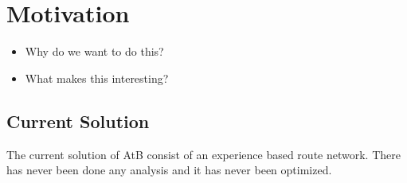 \section{Motivation}
\begin{itemize}
\item Why do we want to do this?
\item What makes this interesting?
\end{itemize}

\subsection{Current Solution}

The current solution of AtB consist of an experience based route network. There has never been done any analysis and it has never been optimized. 

